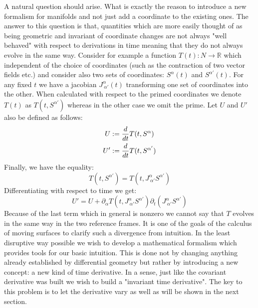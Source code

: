 \documentclass[../main.tex]{subfiles}
\begin{document}
        A natural question should arise. What is exactly the reason to introduce a new formalism for manifolds and not just add a coordinate to the existing ones. The answer to this question is that, quantities which are more easily thought of as being geometric and invariant of coordinate changes are not always "well behaved" with respect to derivations in time meaning that they do not always evolve in the same way. Consider for example a function $T(t):N\to \mathbb{R}$ which independent of the choice of coordinates (such as the contraction of two vector fields etc.) and consider also two sets of coordinates: $S^\alpha(t)$ and $S^{\alpha'}(t)$. For any fixed $t$ we have a jacobian $J^\alpha_{\ \alpha'}(t)$ transforming one set of coordinates into the other. When calculated with respect to the primed coordinates we denote $T(t)$ as $T(t,S^{\alpha'})$ whereas in the other case we omit the prime. Let $U$ and $U'$ also be defined as follows:
        \begin{gather}
            U:=\dfrac{d}{dt}T(t,S^\alpha)   \\
            U':=\dfrac{d}{dt}T(t,S^{\alpha'})
        \end{gather}
        Finally, we have the equality:
        \begin{equation}
            T(t,S^{\alpha'})=T(t,J^\alpha_{\ \alpha'}S^{\alpha'})
        \end{equation}
        Differentiating with respect to time we get:
        \begin{equation}
            U'=U+\partial_\alpha T(t,J^\alpha_{\ \alpha'}S^{\alpha'})\partial_t(J^\alpha_{\ \alpha'}S^{\alpha'})
        \end{equation}
        Because of the last term which in general is nonzero we cannot say that $T$ evolves in the same way in the two reference frames. It is one of the goals of the calculus of moving surfaces to clarify such a divergence from intuition. In the least disruptive way possible we wish to develop a mathematical formalism which provides tools for our basic intuition. This is done not by changing anything already established by differential geometry but rather by introducing a new concept: a new kind of time derivative. In a sense, just like the covariant derivative was built we wish to build a "invariant time derivative". The key to this problem is to let the derivative vary as well as will be shown in the next section.
\end{document}
